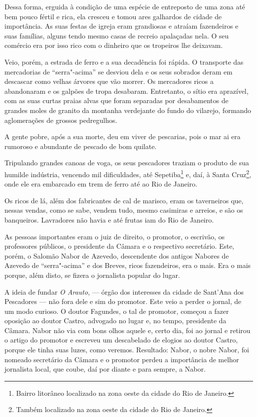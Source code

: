 Dessa forma, erguida à condição de uma espécie de entreposto de uma zona
até bem pouco fértil e rica, ela cresceu e tomou ares galhardos de
cidade de importância. As suas festas de igreja eram grandiosas e
atraíam fazendeiros e suas famílias, alguns tendo mesmo casas de recreio
apalaçadas nela. O seu comércio era por isso rico com o dinheiro que os
tropeiros lhe deixavam.

Veio, porém, a estrada de ferro e a sua decadência foi rápida. O
transporte das mercadorias de ``serra"-acima'' se desviou dela e os seus
sobrados deram em descascar como velhas árvores que vão morrer. Os
mercadores ricos a abandonaram e os galpões de tropa desabaram.
Entretanto, o sítio era aprazível, com as suas curtas praias alvas que
foram separadas por desabamentos de grandes moles de granito da montanha
verdejante do fundo do vilarejo, formando aglomerações de grossos
pedregulhos.

A gente pobre, após a sua morte, deu em viver de pescarias, pois o mar
ai era rumoroso e abundante de pescado de bom quilate.

Tripulando grandes canoas de voga, os seus pescadores traziam o produto
de sua humilde indústria, vencendo mil dificuldades, até
Sepetiba\footnote{Bairro litorâneo
  localizado na zona oeste da
  cidade do Rio de Janeiro.} e, daí, à Santa Cruz\footnote{Também
  localizado na zona oeste da cidade do Rio de Janeiro.}, onde ele era
embarcado em trem de ferro até ao Rio de Janeiro.

Os ricos de lá, além dos fabricantes de cal de marisco, eram os
taverneiros que, nessas vendas, como se sabe, vendem tudo, mesmo
casimiras e arreios, e são os banqueiros. Lavradores não havia e até
frutas iam do Rio de Janeiro.

As pessoas importantes eram o juiz de direito, o promotor, o escrivão,
os professores públicos, o presidente da Câmara e o respectivo
secretário. Este, porém, o Salomão Nabor de Azevedo, descendente dos
antigos Nabores de Azevedo de ``serra"-acima'' e dos Breves, ricos
fazendeiros, era o mais. Era o mais porque, além disto, se fizera o
jornalista popular do lugar.

A ideia de fundar \emph{O Arauto}, --- órgão dos interesses da cidade de
Sant'Ana dos Pescadores --- não fora dele e sim do promotor. Este veio a
perder o jornal, de um modo curioso. O doutor Fagundes, o tal de
promotor, começou a fazer oposição ao doutor Castro, advogado no lugar
e, no tempo, presidente da Câmara. Nabor não via com bons olhos aquele
e, certo dia, foi ao jornal e retirou o artigo do promotor e escreveu um
descabelado de elogios ao doutor Castro, porque ele tinha suas luzes,
como veremos. Resultado: Nabor, o nobre Nabor, foi nomeado secretário da
Câmara e o promotor perdeu a importância de melhor jornalista local, que
coube, daí por diante e para sempre, a Nabor.

